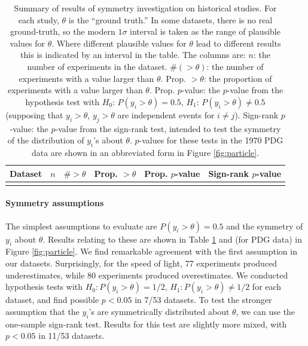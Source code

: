 \documentclass[letterpaper,12pt]{article}
\begin{document}
\begin{table}[htbp]
  \centering
  \caption{Summary of results of symmetry investigation on historical studies. For each study, $\theta$ is the ``ground truth.'' In some datasets, there is no real ground-truth, so the modern $1\sigma$ interval is taken as the range of plausible values for $\theta$. Where different plausible values for $\theta$ lead to different results this is indicated by an interval in the table. The columns are: $n$: the number of experiments in the dataset. $\#(>\theta)$: the number of experiments with a value larger than $\theta$. Prop. $>\theta$: the proportion of experiments with a value larger than $\theta$. Prop. $p$-value: the $p$-value from the hypothesis test with $H_0$: $P(y_i>\theta)=0.5$, $H_1$: $P(y_i>\theta)\neq 0.5$ (supposing that $y_i>\theta$, $y_j>\theta$ are independent events for $i\neq j$). Sign-rank $p$-value: the $p$-value from the sign-rank test, intended to test the symmetry of the distribution of $y_i$'s about $\theta$. $p$-values for these tests in the 1970 PDG data are shown in an abbreviated form in Figure \ref{fig:particle}.}
  \label{tab:hist-sym}
  \smaller
  \begin{tabular}{l|rcccc}
    \hline Dataset & $n$ & $\#>\theta$ & Prop. $>\theta$ & Prop. $p$-value & Sign-rank $p$-value \\\hline\\\hline
  \end{tabular}
\end{table}

\paragraph{Symmetry assumptions} The simplest assumptions to evaluate are $P(y_i>\theta)=0.5$ and the symmetry of $y_i$ about $\theta$. Results relating to these are shown in Table \ref{tab:hist-sym} and (for PDG data) in Figure \ref{fig:particle}. We find remarkable agreement with the first assumption in our datasets. Surprisingly, for the speed of light, 77 experiments produced underestimates, while 80 experiments produced overestimates. We conducted hypothesis tests with $H_0: P(y_i>\theta)=1/2$, $H_1: P(y_i>\theta)\neq 1/2$ for each dataset, and find possible $p<0.05$ in 7/53 datasets. To test the stronger assumption that the $y_i$'s are symmetrically distributed about $\theta$, we can use the one-sample sign-rank test. Results for this test are slightly more mixed, with $p<0.05$ in 11/53 datasets.
\end{document}
